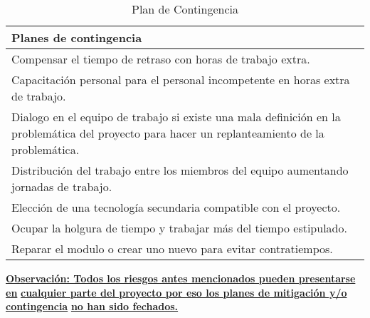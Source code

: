 \begin{table}
	\begin{center}
		\begin{tabular}{|p{14.2cm}|}
			\hline \rowcolor[RGB]{0,102,204} 
				\textcolor{blanco}{\bf Planes de contingencia} \\
			\hline 
				Compensar el tiempo de retraso con horas de trabajo extra. \\
      		\hline 
				Capacitación personal para el personal incompetente en horas extra de trabajo. \\
			\hline 
				Dialogo en el  equipo de trabajo si existe una mala definición en la problemática del proyecto para hacer un replanteamiento de la problemática. \\ 
			\hline
				Distribución del trabajo entre los miembros del equipo aumentando jornadas de trabajo. \\ 
			\hline 
				Elección de una tecnología secundaria compatible con el proyecto. \\ 
			\hline
				Ocupar la holgura de tiempo y trabajar más del tiempo estipulado. \\ 
			\hline
				Reparar el modulo o crear uno nuevo para evitar contratiempos. \\ 
			\hline
		\end{tabular}
	\end{center}
	\caption[Plan de Contingencia]{Plan de Contingencia} 
	\label{tab:planContingencia}
\end{table}

\begin{center}
	{\bf \underline{Observación: Todos los riesgos antes mencionados pueden presentarse en}}
	{\bf \underline{cualquier parte del proyecto por eso  los planes de mitigación y/o contingencia}}
	{\bf \underline{no han sido fechados.}}
\end{center} 

